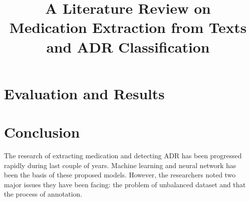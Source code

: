 \documentclass[12pt,conference]{IEEEtran}
\begin{document}
	
	\title{A Literature Review on Medication Extraction from Texts and ADR Classification}
	
	\author{
	}
	
	\maketitle
	
	
	
	
	
	
	
	
	
	
	
	\section{Evaluation and Results}
	
	\section{Conclusion}
		The research of extracting medication and detecting ADR has been progressed rapidly during last couple of years. Machine learning and neural network has been the basis of these proposed models. However, the researchers noted two major issues they have been facing: the problem of unbalanced dataset and that the process of annotation. 
	
	
	
\end{document}
